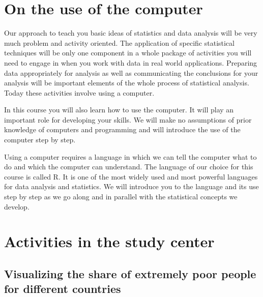 \documentclass[
  letterpaper,
]{scrbook}
\begin{document}
\begin{tcolorbox}
\end{tcolorbox}

\hypertarget{on-the-use-of-the-computer}{%
\section{On the use of the computer}\label{on-the-use-of-the-computer}}

Our approach to teach you basic ideas of statistics and data analysis
will be very much problem and activity oriented. The application of
specific statistical techniques will be only one component in a whole
package of activities you will need to engage in when you work with data
in real world applications. Preparing data appropriately for analysis as
well as communicating the conclusions for your analysis will be
important elements of the whole process of statistical analysis. Today
these activities involve using a computer.

In this course you will also learn how to use the computer. It will play
an important role for developing your skills. We will make no
assumptions of prior knowledge of computers and programming and will
introduce the use of the computer step by step.

Using a computer requires a language in which we can tell the computer
what to do and which the computer can understand. The language of our
choice for this course is called R. It is one of the most widely used
and most powerful languages for data analysis and statistics. We will
introduce you to the language and its use step by step as we go along
and in parallel with the statistical concepts we develop.

\hypertarget{activities-in-the-study-center}{%
\section{Activities in the study
center}\label{activities-in-the-study-center}}

\hypertarget{visualizing-the-share-of-extremely-poor-people-for-different-countries}{%
\subsection{Visualizing the share of extremely poor people for different
countries}\label{visualizing-the-share-of-extremely-poor-people-for-different-countries}}
\end{document}
